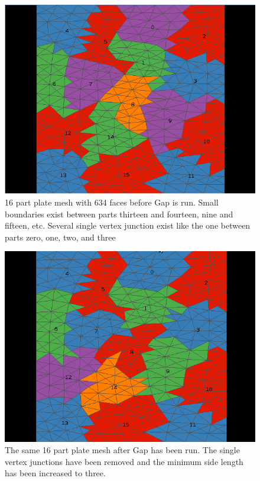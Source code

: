 \documentclass{thesis}
\begin{document}
\begin{figure} [!hb]
\centering
\captionsetup{justification=centering,margin=1cm}
\includegraphics[width=.6\textwidth]{results_before.png}
\caption{\label{fig:plate} \textnormal{16 part plate mesh with 634 faces before Gap is run. Small boundaries exist between parts thirteen and fourteen, nine and fifteen, etc. Several single vertex junction exist like the one between parts zero, one, two, and three}}
\end{figure}

\begin{figure} [!ht]
\centering
\captionsetup{justification=centering,margin=1cm}
\includegraphics[width=.6\textwidth]{results_after.png}
\caption{\label{fig:plate_gap} \textnormal{The same 16 part plate mesh after Gap has been run. The single vertex junctions have been removed and the minimum side length has been increased to three.}}
\end{figure}
\end{document}
